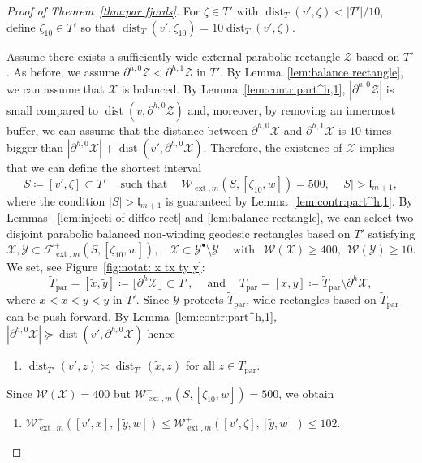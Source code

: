 \documentclass{amsart}
\renewcommand{\sp}{{\ \ }}
\newcommand{\1}{{\mathbb 1 }}
\newcommand{\ext}{{\operatorname{ext}}}
\newcommand{\Fam}{{\mathcal F}}
\newcommand{\Width}{{\mathcal W}}
\newcommand\YY{\mathcal{Y}}
\newcommand\ZZ{\mathcal{Z}}
\newcommand\XX{\mathcal{X}}
\newcommand{\length}{{\mathfrak l}}
\newcommand\parab{{\operatorname{par}}}
\theoremstyle{remark}
\numberwithin{equation}{section}
\theoremstyle{definition}
\newcommand{\dist}{\operatorname{dist}}
\begin{document}
\begin{proof}[Proof of Theorem~\ref{thm:par fjords}] For $\zeta\in T'$ with $\dist_T(v',\zeta)<|T'|/10$, define $\zeta_{10}\in T'$ so that $\dist_T(v',\zeta_{10})=10 \dist_T(v',\zeta)$.


Assume there exists a sufficiently wide external parabolic rectangle  $\ZZ$ based on $T'$. As before, we assume $\partial^{h,0}\ZZ <\partial^{h,1}\ZZ$ in $T'$. By Lemma~\ref{lem:balance rectangle}, we can assume that $\XX$ is balanced. By Lemma~\ref{lem:contr:part^h,1}, $|\partial ^{h,0}\ZZ|$ is small compared to $\dist(v, \partial ^{h,0} \ZZ)$ and, moreover, by removing an innermost buffer, we can assume that the distance between  $\partial ^{h,0}\XX$ and $\partial ^{h,1}\XX$ is $10$-times bigger than $|\partial ^{h,0}\XX|+\dist(v', \partial ^{h,0}  \XX)$. Therefore, the existence of $\XX$ implies that we can define the shortest interval
\begin{equation}
\label{eq:prf:thm:par fjords:defn S}
S\coloneqq [v', \zeta]\subset T'\sp\sp\text{ such that }\sp\sp\Width^+_{\ext, m}(S, [\zeta_{10},w])= 500,\sp\sp |S|> \length_{m+1},
\end{equation} where the condition $|S|> \length_{m+1}$ is guaranteed by Lemma~\ref{lem:contr:part^h,1}. By Lemmas ~\ref{lem:injecti of diffeo rect} and \ref{lem:balance rectangle}, we can select two disjoint parabolic balanced non-winding geodesic rectangles based on $T'$ satisfying
\[\XX, \YY\subset \Fam^+_{\ext, m}(S,[\zeta_{10},w]), \sp\sp \XX\subset \YY^\bullet \setminus \YY\sp\sp\text{ with }\sp \Width(\XX)\ge 400,\sp \Width(\YY)\ge 10. \] 
We set, see Figure~\ref{fig:notat: x tx ty y}: 
\begin{equation}
\label{thm:par fjords:prf:1} \widetilde T_\parab=[\tilde x,\tilde y] \coloneqq \lfloor\partial^h \XX\rfloor \subset T',\sp\sp\text{ and }\sp\sp  T_\parab=[x,y] \coloneqq \widetilde T_\parab\setminus \partial^h \XX,\end{equation}
where $\tilde x< x <  y < \tilde y $ in $T'$.
Since $\YY$ protects $\widetilde T_\parab$, wide rectangles based on $\widetilde T_\parab$ can be push-forward. By Lemma~\ref{lem:contr:part^h,1}, $|\partial^{h,0}\XX|\succeq \dist (v',\partial^{h,0}\XX)$ hence
\begin{enumerate}[label=\text{(\Alph*)},font=\normalfont,leftmargin=*]
\item \label{prop:A:prf:thm:par fjords}$\dist_{T'}(v', z) \asymp \dist_{T'}(\tilde x, z) $ for all $z\in T_\parab$.
\end{enumerate}
Since $\Width(\XX)=400$ but $\Width^+_{\ext, m}(S, [\zeta_{10},w])= 500$, we obtain 
\begin{enumerate}[label=\text{(\Alph*)},font=\normalfont, start =2,leftmargin=*]
\item \label{prop:B:prf:thm:par fjords} $\Width^+_{\ext, m}([v',x], [\tilde y,w])\le  \Width^+_{\ext, m}([v',\zeta], [\tilde y,w])\le 102$.
\end{enumerate}



\end{proof}
\end{document}
